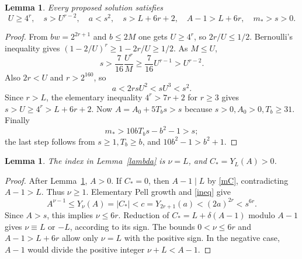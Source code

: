\documentclass[11pt]{article}
\newtheorem{lemma}[theorem]{Lemma}
\begin{document}
\begin{lemma}\label{growth}
Every proposed solution satisfies
\[
 U\ge4^r,\quad s>U^{r-2},\quad a<s^2,\quad
 s>L+6r+2,\quad A-1>L+6r,\quad m_*>s>0.
\]
\end{lemma}
\begin{proof}
From \(bw=2^{2r+1}\) and \(b\le2M\) one gets \(U\ge4^r\),
so \(2r/U\le1/2\). Bernoulli's inequality gives
\((1-2/U)^r\ge1-2r/U\ge1/2\). As \(M\le U\),
\[
 s>\frac7{16}\frac{U^r}{M}\ge\frac7{16}U^{r-1}>U^{r-2}.
\]
Also \(2r<U\) and \(r>2^{160}\), so
\[
                       a<2rsU^2<sU^3<s^2.
\]
Since \(r>L\), the elementary inequality \(4^r>7r+2\) for
\(r\ge3\) gives \(s>U\ge4^r>L+6r+2\).
Now \(A=A_0+5T_bs>s\) because \(s>0,A_0>0,T_b\ge31\).
Finally
\[
                   m_*>10bT_bs-b^2-1>s;
\]
the last step follows from \(s\ge1,T_b\ge b\), and
\(10b^2-1>b^2+1\).
\end{proof}

\begin{lemma}\label{index}
The index in Lemma~\ref{lambda} is \(\nu=L\), and
\(C_*=Y_L(A)>0\).
\end{lemma}
\begin{proof}
After Lemma~\ref{growth}, \(A>0\).
If \(C_*=0\), then \(A-1\mid L\) by \eqref{mC},
contradicting \(A-1>L\). Thus \(\nu\ge1\).
Elementary Pell growth and \eqref{ineq} give
\[
 A^{\nu-1}\le Y_\nu(A)=|C_*|
       <c=Y_{2r+1}(a)<(2a)^{2r}<s^{6r}.
\]
Since \(A>s\), this implies \(\nu\le6r\).
Reduction of \(C_*=L+\delta(A-1)\) modulo \(A-1\) gives
\(\nu\equiv L\) or \(-L\), according to its sign.
The bounds \(0<\nu\le6r\) and \(A-1>L+6r\) allow only
\(\nu=L\) with the positive sign. In the negative case,
\(A-1\) would divide the positive integer \(\nu+L<A-1\).
\end{proof}
\end{document}
